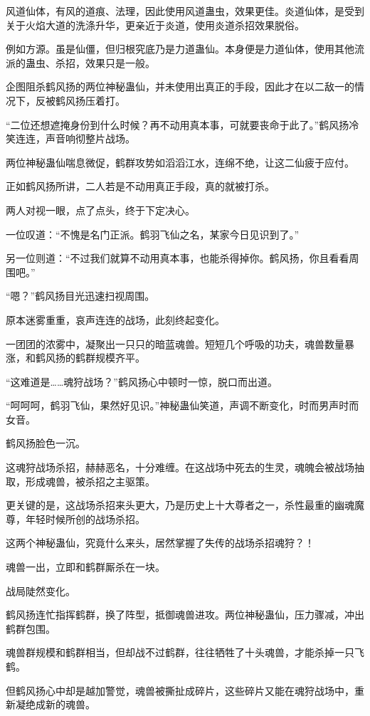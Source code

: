 \begin{this_body}
风道仙体，有风的道痕、法理，因此使用风道蛊虫，效果更佳。炎道仙体，是受到关于火焰大道的洗涤升华，更亲近于炎道，使用炎道杀招效果脱俗。

例如方源。虽是仙僵，但归根究底乃是力道蛊仙。本身便是力道仙体，使用其他流派的蛊虫、杀招，效果只是一般。

企图阻杀鹤风扬的两位神秘蛊仙，并未使用出真正的手段，因此才在以二敌一的情况下，反被鹤风扬压着打。

“二位还想遮掩身份到什么时候？再不动用真本事，可就要丧命于此了。”鹤风扬冷笑连连，声音响彻整片战场。

两位神秘蛊仙喘息微促，鹤群攻势如滔滔江水，连绵不绝，让这二仙疲于应付。

正如鹤风扬所讲，二人若是不动用真正手段，真的就被打杀。

两人对视一眼，点了点头，终于下定决心。

一位叹道：“不愧是名门正派。鹤羽飞仙之名，某家今日见识到了。”

另一位则道：“不过我们就算不动用真本事，也能杀得掉你。鹤风扬，你且看看周围吧。”

“嗯？”鹤风扬目光迅速扫视周围。

原本迷雾重重，哀声连连的战场，此刻终起变化。

一团团的浓雾中，凝聚出一只只的暗蓝魂兽。短短几个呼吸的功夫，魂兽数量暴涨，和鹤风扬的鹤群规模齐平。

“这难道是……魂狩战场？”鹤风扬心中顿时一惊，脱口而出道。

“呵呵呵，鹤羽飞仙，果然好见识。”神秘蛊仙笑道，声调不断变化，时而男声时而女音。

鹤风扬脸色一沉。

这魂狩战场杀招，赫赫恶名，十分难缠。在这战场中死去的生灵，魂魄会被战场抽取，形成魂兽，被杀招之主驱策。

更关键的是，这战场杀招来头更大，乃是历史上十大尊者之一，杀性最重的幽魂魔尊，年轻时候所创的战场杀招。

这两个神秘蛊仙，究竟什么来头，居然掌握了失传的战场杀招魂狩？！

魂兽一出，立即和鹤群厮杀在一块。

战局陡然变化。

鹤风扬连忙指挥鹤群，换了阵型，抵御魂兽进攻。两位神秘蛊仙，压力骤减，冲出鹤群包围。

魂兽群规模和鹤群相当，但却战不过鹤群，往往牺牲了十头魂兽，才能杀掉一只飞鹤。

但鹤风扬心中却是越加警觉，魂兽被撕扯成碎片，这些碎片又能在魂狩战场中，重新凝绝成新的魂兽。


\end{this_body}

